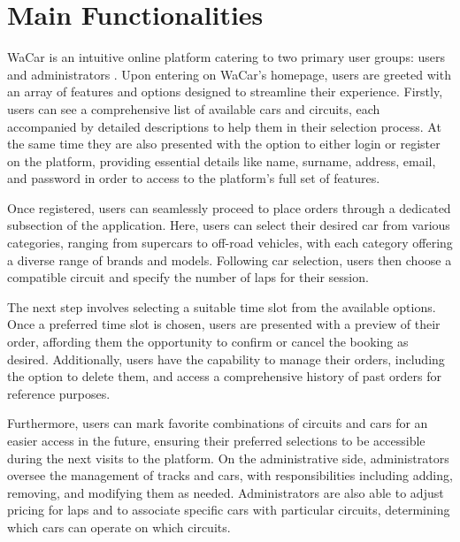 \section{Main Functionalities}


WaCar is an intuitive online platform catering to two primary user groups: users and administrators . Upon entering on WaCar's homepage, users are greeted with an array of features and options designed to streamline their experience. Firstly, users can see a comprehensive list of available cars and circuits, each accompanied by detailed descriptions to help them in their selection process. At the same time they are also presented with the option to either login or register on the platform, providing essential details like name, surname, address, email, and password in order to access to the platform's full set of features.

Once registered, users can seamlessly proceed to place orders through a dedicated subsection of the application. Here, users can select their desired car from various categories, ranging from supercars to off-road vehicles, with each category offering a diverse range of brands and models. Following car selection, users then choose a compatible circuit and specify the number of laps for their session.

The next step involves selecting a suitable time slot from the available options. Once a preferred time slot is chosen, users are presented with a preview of their order, affording them the opportunity to confirm or cancel the booking as desired. Additionally, users have the capability to manage their orders, including the option to delete them, and access a comprehensive history of past orders for reference purposes.

Furthermore, users can mark favorite combinations of circuits and cars for an easier access in the future, ensuring their preferred selections to be accessible during the next visits to the platform.
On the administrative side, administrators oversee the management of tracks and cars, with responsibilities including adding, removing, and modifying them as needed. Administrators are also able to adjust pricing for laps and to associate specific cars with particular circuits, determining which cars can operate on which circuits.